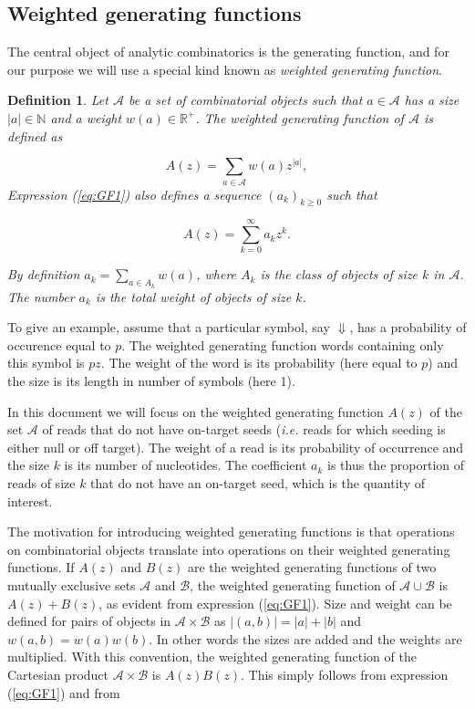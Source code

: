 \documentclass{article}
\newtheorem{definition}{Definition}
\begin{document}
\subsection{Weighted generating functions}

The central object of analytic combinatorics is the generating function,
and for our purpose we will use a special kind known as \emph{weighted
generating function}.

\begin{definition}
\label{def:GF}
Let $\mathcal{A}$ be a set of combinatorial objects such that $a \in
\mathcal{A}$ has a size $|a| \in \mathbb{N}$ and a weight $w(a) \in
\mathbb{R}^+$. The weighted generating function of $\mathcal{A}$ is
defined as

\begin{equation}
\label{eq:GF1}
A(z) = \sum_{a \in \mathcal{A}} w(a) z^{|a|},
\end{equation}
Expression (\ref{eq:GF1}) also defines a sequence $(a_k)_{k \geq 0}$ such
that 

\begin{equation*}
A(z) = \sum_{k=0}^\infty a_k z^k.
\end{equation*}

By definition $a_k = \sum_{a \in A_k}w(a)$, where $A_k$ is the class of
objects of size $k$ in $\mathcal{A}$. The number $a_k$ is the
total weight of objects of size $k$.
\end{definition}

To give an example, assume that a particular symbol, say $\Downarrow$, has
a probability of occurence equal to $p$. The weighted generating function
words containing only this symbol is $pz$. The weight of the word is
its probability (here equal to $p$) and the size is its length in number
of symbols (here 1).

In this document we will focus on the weighted generating function $A(z)$
of the set $\mathcal{A}$ of reads that do not have on-target seeds
(\textit{i.e.} reads for which seeding is either null or off target). The
weight of a read is its probability of occurrence and the size $k$ is its
number of nucleotides. The coefficient $a_k$ is thus the proportion of
reads of size $k$ that do not have an on-target seed, which is the
quantity of interest.

The motivation for introducing weighted generating functions is that
operations on combinatorial objects translate into operations on their
weighted generating functions. If $A(z)$ and $B(z)$ are the weighted
generating functions of two mutually exclusive sets $\mathcal{A}$ and
$\mathcal{B}$, the weighted generating function of $\mathcal{A} \cup
\mathcal{B}$ is $A(z) + B(z)$, as evident from expression (\ref{eq:GF1}).
Size and weight can be defined for pairs of objects in $\mathcal{A} \times
\mathcal{B}$ as $|(a,b)| = |a| + |b|$ and $w(a,b) = w(a)w(b)$. In other
words the sizes are added and the weights are multiplied.  With this
convention, the weighted generating function of the Cartesian product
$\mathcal{A} \times \mathcal{B}$ is $A(z)B(z)$. This simply follows from
expression (\ref{eq:GF1}) and from
\end{document}

